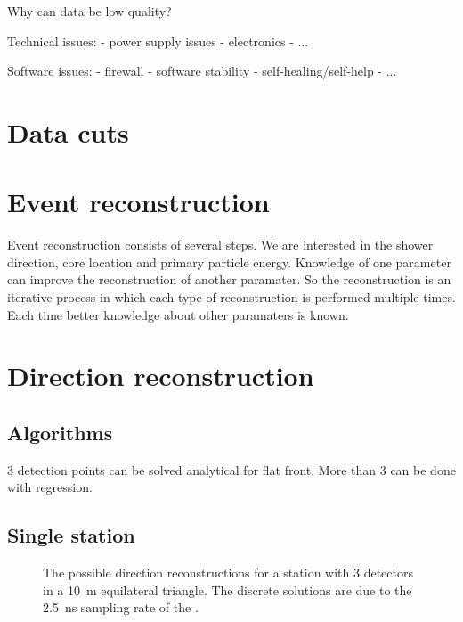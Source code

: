Why can data be low quality?

Technical issues:
- power supply issues
- electronics
- ...

Software issues:
- firewall
- software stability
- self-healing/self-help
- ...


\section{Data cuts}




\section{Event reconstruction}

Event reconstruction consists of several steps. We are interested in the
shower direction, core location and primary particle energy. Knowledge
of one  parameter can improve the reconstruction of another paramater.
So the reconstruction is an iterative process in which each type of
reconstruction is performed multiple times. Each time better knowledge
about other paramaters is known.


\section{Direction reconstruction}

\subsection{Algorithms}

3 detection points can be solved analytical for flat front.
More than 3 can be done with regression.

\subsection{Single station}

\begin{figure}
    \centering
    
    \caption{ The possible
             direction reconstructions for a station with 3 detectors in
             a \SI{10}{\meter} equilateral triangle. The discrete
             solutions are due to the \SI{2.5}{\nano\second} sampling
             rate of the \adcs.}
    \label{fig:discrete_directions}
\end{figure}

